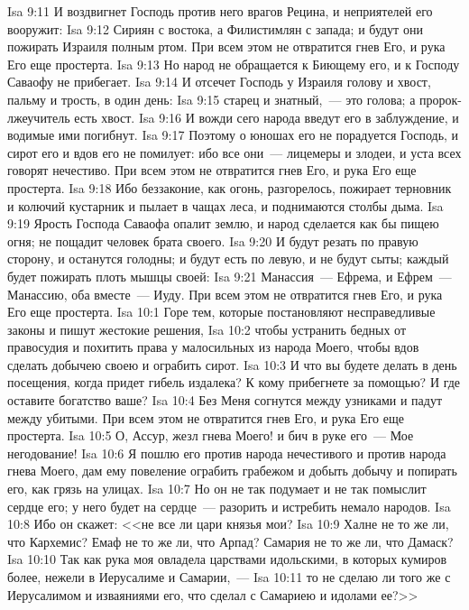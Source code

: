 \vs Isa 9:11 И воздвигнет Господь против него врагов Рецина, и неприятелей его вооружит:
\vs Isa 9:12 Сириян с востока, а Филистимлян с запада; и будут они пожирать Израиля полным ртом. При всем этом не отвратится гнев Его, и рука Его еще простерта.
\vs Isa 9:13 Но народ не обращается к Биющему его, и к Господу Саваофу не прибегает.
\vs Isa 9:14 И отсечет Господь у Израиля голову и хвост, пальму и трость, в один день:
\vs Isa 9:15 старец и знатный,~--- это голова; а пророк-лжеучитель есть хвост.
\vs Isa 9:16 И вожди сего народа введут его в заблуждение, и водимые ими погибнут.
\vs Isa 9:17 Поэтому о юношах его не порадуется Господь, и сирот его и вдов его не помилует: ибо все они~--- лицемеры и злодеи, и уста всех говорят нечестиво. При всем этом не отвратится гнев Его, и рука Его еще простерта.
\vs Isa 9:18 Ибо беззаконие, как огонь, разгорелось, пожирает терновник и колючий кустарник и пылает в чащах леса, и поднимаются столбы дыма.
\vs Isa 9:19 Ярость Господа Саваофа опалит землю, и народ сделается как бы пищею огня; не пощадит человек брата своего.
\vs Isa 9:20 И будут резать по правую сторону, и останутся голодны; и будут есть по левую, и не будут сыты; каждый будет пожирать плоть мышцы своей:
\vs Isa 9:21 Манассия~--- Ефрема, и Ефрем~--- Манассию, оба вместе~--- Иуду. При всем этом не отвратится гнев Его, и рука Его еще простерта.
\vs Isa 10:1 Горе тем, которые постановляют несправедливые законы и пишут жестокие решения,
\vs Isa 10:2 чтобы устранить бедных от правосудия и похитить права у малосильных из народа Моего, чтобы вдов сделать добычею своею и ограбить сирот.
\vs Isa 10:3 И что вы будете делать в день посещения, когда придет гибель издалека? К кому прибегнете за помощью? И где оставите богатство ваше?
\vs Isa 10:4 Без Меня согнутся между узниками и падут между убитыми. При всем этом не отвратится гнев Его, и рука Его еще простерта.
\vs Isa 10:5 О, Ассур, жезл гнева Моего! и бич в руке его~--- Мое негодование!
\vs Isa 10:6 Я пошлю его против народа нечестивого и против народа гнева Моего, дам ему повеление ограбить грабежом и добыть добычу и попирать его, как грязь на улицах.
\vs Isa 10:7 Но он не так подумает и не так помыслит сердце его; у него будет на сердце~--- разорить и истребить немало народов.
\vs Isa 10:8 Ибо он скажет: <<не все ли цари князья мои?
\vs Isa 10:9 Халне не то же ли, что Кархемис? Емаф не то же ли, что Арпад? Самария не то же ли, что Дамаск?
\vs Isa 10:10 Так как рука моя овладела царствами идольскими, в которых кумиров более, нежели в Иерусалиме и Самарии,~---
\vs Isa 10:11 то не сделаю ли того же с Иерусалимом и изваяниями его, что сделал с Самариею и идолами ее?>>
